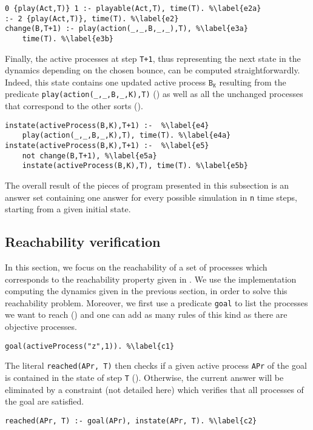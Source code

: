 \begin{lstlisting}
0 {play(Act,T)} 1 :- playable(Act,T), time(T). %\label{e2a}
:- 2 {play(Act,T)}, time(T). %\label{e2}
change(B,T+1) :- play(action(_,_,B,_,_),T), %\label{e3a}
	time(T). %\label{e3b}
\end{lstlisting}

Finally, the active processes at step \texttt{T+1},
thus representing the next state in the dynamics depending on the chosen bounce,
can be computed straightforwardly.
Indeed, this state contains one updated active process $\texttt{B}_\texttt{K}$
resulting from the predicate \texttt{play(action(\_,\_,B,\_,K),T)} ()
as well as all the unchanged processes that correspond to the other sorts ().
\begin{lstlisting}
instate(activeProcess(B,K),T+1) :-  %\label{e4}
	play(action(_,_,B,_,K),T), time(T). %\label{e4a}
instate(activeProcess(B,K),T+1) :-  %\label{e5}
	not change(B,T+1), %\label{e5a}
	instate(activeProcess(B,K),T), time(T). %\label{e5b}
\end{lstlisting}

The overall result of the pieces of program presented in this subsection
is an answer set containing one answer for every
possible simulation in \texttt{n} time steps,
starting from a given initial state.

\subsection{Reachability verification}
In this section, we focus on the reachability of a set of processes which corresponds to the reachability property given in .
We use the implementation computing the dynamics given in the previous section, in order to solve this reachability problem.
Moreover, we first use a predicate \texttt{goal} to list the processes we want to reach () and one can add as many rules of this kind as there are objective processes.
\begin{lstlisting}
goal(activeProcess("z",1)). %\label{c1}
\end{lstlisting}
The literal \texttt{reached(APr, T)} then
checks if a given active process \texttt{APr} of the goal
is contained in the state of step \texttt{T} ().
Otherwise, the current answer will be eliminated by a constraint (not detailed here) which verifies that all processes of the goal are satisfied.
\begin{lstlisting}
reached(APr, T) :- goal(APr), instate(APr, T). %\label{c2}
\end{lstlisting}

